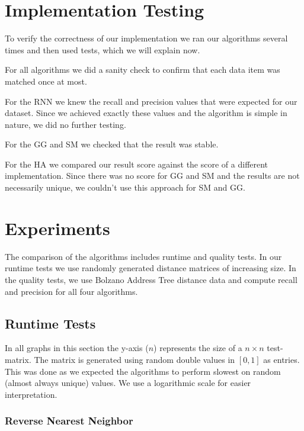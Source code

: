 \documentclass[a4paper,11pt]{article}
\begin{document}
\section{Implementation Testing}

To verify the correctness of our implementation we ran our algorithms several times and then used tests, which we will explain now.

For all algorithms we did a sanity check to confirm that each data item was matched once at most.

For the RNN we knew the recall and precision values that were expected for our dataset. Since we achieved exactly these values and the algorithm is simple in nature, we did no further testing.

For the GG and SM we checked that the result was stable.

For the HA we compared our result score against the score of a different implementation. Since there was no score for GG and SM and the results are not necessarily unique, we couldn't use this approach for SM and GG.

\section{Experiments}

The comparison of the algorithms includes runtime and quality tests. In our runtime tests we use randomly generated distance matrices of increasing size. In the quality tests, we use Bolzano Address Tree distance data and compute recall and precision for all four algorithms.

\subsection{Runtime Tests}

In all graphs in this section the y-axis ($n$) represents the size of a $n \times n$ test-matrix. The matrix is generated using random double values in $[0,1]$ as entries. This was done as we expected the algorithms to perform slowest on random (almost always unique) values. We use a logarithmic scale for easier interpretation.

\subsubsection{Reverse Nearest Neighbor}
\end{document}
